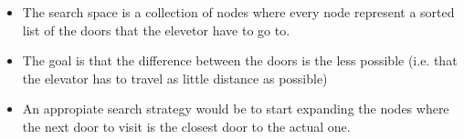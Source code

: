 \documentclass[paper=a4, fontsize=11pt]{scrartcl} %
\numberwithin{equation}{section} %
\numberwithin{figure}{section} %
\numberwithin{table}{section} %
\begin{document}
\begin{itemize}
	\item The search space is a collection of nodes where every node represent a sorted list of the doors that the elevetor have to go to.
	\item The goal is that the difference between the doors is the less possible (i.e. that the elevator has to travel as little distance as possible)
	\item An appropiate search strategy would be to start expanding the nodes where the next door to visit is the closest door to the actual one.	
\end{itemize}




\end{document}
